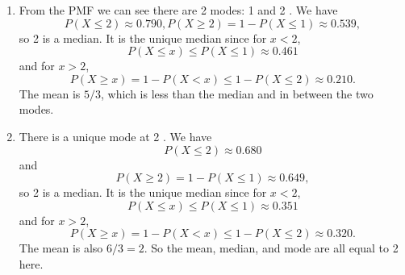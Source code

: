 
\setcounter{theorem}{3}
\begin{exercise} [BH.6.4]
\begin{solution}
    \begin{enumerate}
        \item   From the PMF we can see there are 2 modes:   1 and 2 . We have
        $$
        P(X \leq 2) \approx 0.790, P(X \geq 2)=1-P(X \leq 1) \approx 0.539,
        $$
        so 2 is a median. It is the unique median since for $x<2$,
        $$
        P(X \leq x) \leq P(X \leq 1) \approx 0.461
        $$
        and for $x>2$,
        $$
        P(X \geq x)=1-P(X<x) \leq 1-P(X \leq 2) \approx 0.210 .
        $$
        The mean is $5 / 3$, which is less than the median and in between the two modes.
        \item There is a unique mode at 2 . We have
        $$
        P(X \leq 2) \approx 0.680
        $$
        and
        $$
        P(X \geq 2)=1-P(X \leq 1) \approx 0.649,
        $$
        so 2 is a median. It is the unique median since for $x<2$,
        $$
        P(X \leq x) \leq P(X \leq 1) \approx 0.351
        $$
        and for $x>2$,
        $$
        P(X \geq x)=1-P(X<x) \leq 1-P(X \leq 2) \approx 0.320 .
        $$
        The mean is also $6 / 3=2$. So the mean, median, and mode are all equal to 2 here.
    \end{enumerate}
\end{solution}
\end{exercise}

